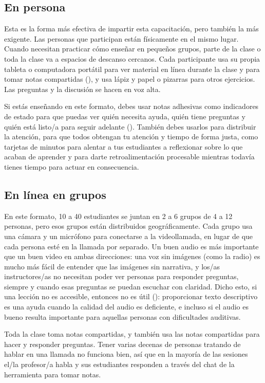\subsection*{En persona}

Esta es la forma más efectiva de impartir esta capacitación,
pero también la más exigente.
Las personas que participan están físicamente en el mismo lugar.
Cuando necesitan practicar cómo enseñar en pequeños grupos,
parte de la clase o toda la clase va a espacios de descanso cercanos.
Cada participante usa su propia tableta o computadora portátil para ver material en línea durante la clase
y para tomar notas compartidas (),
y usa lápiz y papel o pizarras para otros ejercicios.
Las preguntas y la discusión se hacen en voz alta.

Si estás enseñando en este formato,
debes usar notas adhesivas como indicadores de estado
para que puedas ver quién necesita ayuda,
quién tiene preguntas
y quién está listo/a para seguir adelante ().
También debes usarlos para distribuir la atención,
para que todos obtengan tu atención y tiempo de forma justa,
como tarjetas de minutos para alentar a tus estudiantes a reflexionar sobre lo que acaban de aprender
y para darte retroalimentación procesable mientras todavía tienes tiempo para actuar en consecuencia.

\subsection*{En línea en grupos}

En este formato,
10 a 40 estudiantes se juntan en 2 a 6 grupos de 4 a 12 personas,
pero esos grupos están distribuidos geográficamente.
Cada grupo usa una cámara y un micrófono para conectarse a la videollamada,
en lugar de que cada persona esté en la llamada por separado.
Un buen audio es más importante que un buen video en ambas direcciones:
una voz sin imágenes (como la radio)
es mucho más fácil de entender que las imágenes sin narrativa,
y los/as instructores/as no necesitan poder ver personas para responder preguntas,
siempre y cuando esas preguntas se puedan escuchar con claridad.
Dicho esto,
si una lección no es accesible, entonces no es útil ():
proporcionar texto descriptivo es una ayuda cuando la calidad del audio es deficiente,
e incluso si el audio es bueno resulta importante para aquellas personas con dificultades auditivas. 

Toda la clase toma notas compartidas,
y también usa las notas compartidas para hacer y responder preguntas.
Tener varias decenas de personas tratando de hablar en una llamada no funciona bien,
así que en la mayoría de las sesiones
el/la profesor/a habla y sus estudiantes responden a través del chat de la herramienta para tomar notas.

